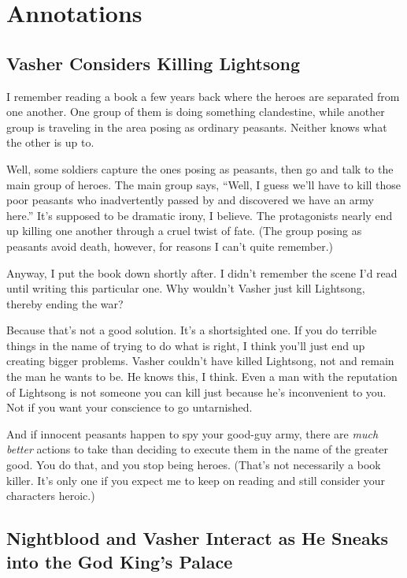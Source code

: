 \section*{Annotations}

\subsection*{Vasher Considers Killing Lightsong}

I remember reading a book a few years back where the heroes are separated from one another. One group of them is doing something clandestine, while another group is traveling in the area posing as ordinary peasants. Neither knows what the other is up to.

Well, some soldiers capture the ones posing as peasants, then go and talk to the main group of heroes. The main group says, “Well, I guess we’ll have to kill those poor peasants who inadvertently passed by and discovered we have an army here.” It’s supposed to be dramatic irony, I believe. The protagonists nearly end up killing one another through a cruel twist of fate. (The group posing as peasants avoid death, however, for reasons I can’t quite remember.)

Anyway, I put the book down shortly after. I didn’t remember the scene I’d read until writing this particular one. Why wouldn’t Vasher just kill Lightsong, thereby ending the war?

Because that’s not a good solution. It’s a shortsighted one. If you do terrible things in the name of trying to do what is right, I think you’ll just end up creating bigger problems. Vasher couldn’t have killed Lightsong, not and remain the man he wants to be. He knows this, I think. Even a man with the reputation of Lightsong is not someone you can kill just because he’s inconvenient to you. Not if you want your conscience to go untarnished.

And if innocent peasants happen to spy your good-guy army, there are \textit{much better} actions to take than deciding to execute them in the name of the greater good. You do that, and you stop being heroes. (That’s not necessarily a book killer. It’s only one if you expect me to keep on reading and still consider your characters heroic.)

\subsection*{Nightblood and Vasher Interact as He Sneaks into the God King’s Palace}

